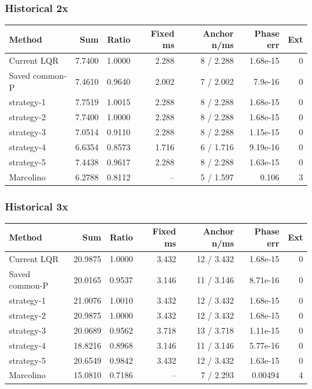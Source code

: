 \documentclass[11pt,a4paper]{article}
\begin{document}
\subsubsection*{Historical 2x}
\begin{center}\begin{tabular}{lrrrrrr}
\toprule
Method & Sum & Ratio & Fixed ms & Anchor n/ms & Phase err & Ext \\
\midrule
Current LQR & 7.7400 & 1.0000 & 2.288 & 8 / 2.288 & 1.68e-15 & 0 \\
Saved common-P & 7.4610 & 0.9640 & 2.002 & 7 / 2.002 & 7.9e-16 & 0 \\
strategy-1 & 7.7519 & 1.0015 & 2.288 & 8 / 2.288 & 1.68e-15 & 0 \\
strategy-2 & 7.7400 & 1.0000 & 2.288 & 8 / 2.288 & 1.68e-15 & 0 \\
strategy-3 & 7.0514 & 0.9110 & 2.288 & 8 / 2.288 & 1.15e-15 & 0 \\
strategy-4 & 6.6354 & 0.8573 & 1.716 & 6 / 1.716 & 9.19e-16 & 0 \\
strategy-5 & 7.4438 & 0.9617 & 2.288 & 8 / 2.288 & 1.63e-15 & 0 \\
Marcolino & 6.2788 & 0.8112 & -- & 5 / 1.597 & 0.106 & 3 \\
\bottomrule
\end{tabular}\end{center}
\subsubsection*{Historical 3x}
\begin{center}\begin{tabular}{lrrrrrr}
\toprule
Method & Sum & Ratio & Fixed ms & Anchor n/ms & Phase err & Ext \\
\midrule
Current LQR & 20.9875 & 1.0000 & 3.432 & 12 / 3.432 & 1.68e-15 & 0 \\
Saved common-P & 20.0165 & 0.9537 & 3.146 & 11 / 3.146 & 8.71e-16 & 0 \\
strategy-1 & 21.0076 & 1.0010 & 3.432 & 12 / 3.432 & 1.68e-15 & 0 \\
strategy-2 & 20.9875 & 1.0000 & 3.432 & 12 / 3.432 & 1.68e-15 & 0 \\
strategy-3 & 20.0689 & 0.9562 & 3.718 & 13 / 3.718 & 1.11e-15 & 0 \\
strategy-4 & 18.8216 & 0.8968 & 3.146 & 11 / 3.146 & 5.77e-16 & 0 \\
strategy-5 & 20.6549 & 0.9842 & 3.432 & 12 / 3.432 & 1.63e-15 & 0 \\
Marcolino & 15.0810 & 0.7186 & -- & 7 / 2.293 & 0.00494 & 4 \\
\bottomrule
\end{tabular}\end{center}
\end{document}
